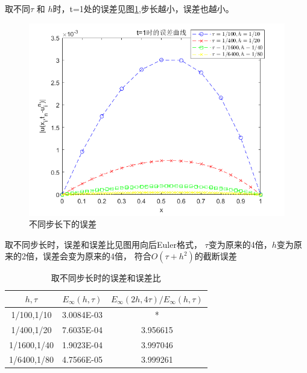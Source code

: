 \documentclass[withoutpreface,bwprint]{cumcmthesis} %
\begin{document}
	
	
	取不同$\tau$ 和 $h$时，t=1处的误差见图\ref{fig:f2},步长越小，误差也越小。
	\begin{figure}
		\centering
		\includegraphics[width=0.7\linewidth]{figures/f2}
		\caption{不同步长下的误差}
		\label{fig:f2}
	\end{figure}
	
	

	取不同步长时，误差和误差比见图用向后Euler格式， $\tau$变为原来的4倍，$h$变为原来的2倍，误差会变为原来的4倍，
	符合$O(\tau+h^2)$的截断误差
	
	\begin{table}[htbp]
		\centering
		\caption{取不同步长时的误差和误差比}
		\begin{tabular}{ccc}
			\toprule[1.5pt]
			$h,\tau$   & $E_{\infty}(h,\tau)$ & $E_{\infty}(2h,4\tau)/E_{\infty}(h,\tau)$ \\
			\midrule[1pt]
			1/100,1/10 & 3.0084E-03 & * \\
			1/400,1/20 & 7.6035E-04 & 3.956615  \\
			1/1600,1/40 & 1.9023E-04 & 3.997046  \\
			1/6400,1/80 & 4.7566E-05 & 3.999261  \\
			\bottomrule[1.5pt]
		\end{tabular}%
		\label{tab:2}%
	\end{table}%
\end{document}
